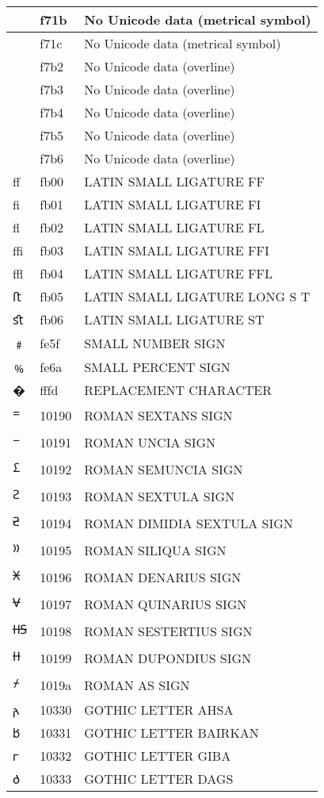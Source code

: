 \documentclass[12pt,letterpaper,openany]{book}
\begin{document}
\begin{center}
\begin{supertabular}{|m{0.25in}|m{0.5in}|m{4in}|}
 & f71b & No Unicode data (metrical symbol)\\\hline
 & f71c & No Unicode data (metrical symbol)\\\hline
 & f7b2 & No Unicode data (overline)\\\hline
 & f7b3 & No Unicode data (overline)\\\hline
 & f7b4 & No Unicode data (overline)\\\hline
 & f7b5 & No Unicode data (overline)\\\hline
 & f7b6 & No Unicode data (overline)\\\hline
ﬀ & fb00 & LATIN SMALL LIGATURE FF\\\hline
ﬁ & fb01 & LATIN SMALL LIGATURE FI\\\hline
ﬂ & fb02 & LATIN SMALL LIGATURE FL\\\hline
ﬃ & fb03 & LATIN SMALL LIGATURE FFI\\\hline
ﬄ & fb04 & LATIN SMALL LIGATURE FFL\\\hline
ﬅ & fb05 & LATIN SMALL LIGATURE LONG S T\\\hline
ﬆ & fb06 & LATIN SMALL LIGATURE ST\\\hline
﹟ & fe5f & SMALL NUMBER SIGN\\\hline
﹪ & fe6a & SMALL PERCENT SIGN\\\hline
� & fffd & REPLACEMENT CHARACTER\\\hline
𐆐 & 10190 & ROMAN SEXTANS SIGN\\\hline
𐆑 & 10191 & ROMAN UNCIA SIGN\\\hline
𐆒 & 10192 & ROMAN SEMUNCIA SIGN\\\hline
𐆓 & 10193 & ROMAN SEXTULA SIGN\\\hline
𐆔 & 10194 & ROMAN DIMIDIA SEXTULA SIGN\\\hline
𐆕 & 10195 & ROMAN SILIQUA SIGN\\\hline
𐆖 & 10196 & ROMAN DENARIUS SIGN\\\hline
𐆗 & 10197 & ROMAN QUINARIUS SIGN\\\hline
𐆘 & 10198 & ROMAN SESTERTIUS SIGN\\\hline
𐆙 & 10199 & ROMAN DUPONDIUS SIGN\\\hline
𐆚 & 1019a & ROMAN AS SIGN\\\hline
𐌰 & 10330 & GOTHIC LETTER AHSA\\\hline
𐌱 & 10331 & GOTHIC LETTER BAIRKAN\\\hline
𐌲 & 10332 & GOTHIC LETTER GIBA\\\hline
𐌳 & 10333 & GOTHIC LETTER DAGS\\\hline

\end{supertabular}
\end{center}
\end{document}
